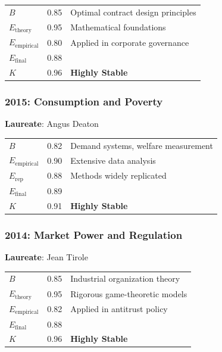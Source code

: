 \documentclass[11pt,a4paper]{article}
\begin{document}
\begin{center}
\begin{tabular}{lcl}
\toprule
$B$ & 0.85 & Optimal contract design principles \\
$E_{\text{theory}}$ & 0.95 & Mathematical foundations \\
$E_{\text{empirical}}$ & 0.80 & Applied in corporate governance \\
\midrule
$E_{\text{final}}$ & 0.88 & \\
$K$ & 0.96 & \textbf{Highly Stable} \\
\bottomrule
\end{tabular}
\end{center}

\subsubsection{2015: Consumption and Poverty}
\textbf{Laureate}: Angus Deaton

\begin{center}
\begin{tabular}{lcl}
\toprule
$B$ & 0.82 & Demand systems, welfare measurement \\
$E_{\text{empirical}}$ & 0.90 & Extensive data analysis \\
$E_{\text{rep}}$ & 0.88 & Methods widely replicated \\
\midrule
$E_{\text{final}}$ & 0.89 & \\
$K$ & 0.91 & \textbf{Highly Stable} \\
\bottomrule
\end{tabular}
\end{center}

\subsubsection{2014: Market Power and Regulation}
\textbf{Laureate}: Jean Tirole

\begin{center}
\begin{tabular}{lcl}
\toprule
$B$ & 0.85 & Industrial organization theory \\
$E_{\text{theory}}$ & 0.95 & Rigorous game-theoretic models \\
$E_{\text{empirical}}$ & 0.82 & Applied in antitrust policy \\
\midrule
$E_{\text{final}}$ & 0.88 & \\
$K$ & 0.96 & \textbf{Highly Stable} \\
\bottomrule
\end{tabular}
\end{center}
\end{document}
